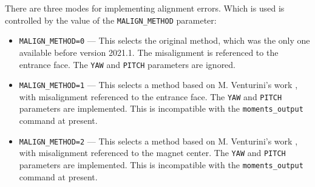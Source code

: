 There are three modes for implementing alignment errors. Which is used
is controlled by the value of the \verb|MALIGN_METHOD| parameter:
\begin{itemize}
\item \verb|MALIGN_METHOD=0| --- This selects the original method, which was
  the only one available before version 2021.1. The misalignment is
  referenced to the entrance face. The \verb|YAW| and \verb|PITCH| parameters
  are ignored.
\item \verb|MALIGN_METHOD=1| --- This selects a method based on M. Venturini's
  work \cite{Venturini2021}, with misalignment referenced to the entrance face.
  The \verb|YAW| and \verb|PITCH| parameters are implemented.
  This is incompatible with the \verb|moments_output| command at present.
\item \verb|MALIGN_METHOD=2| --- This selects a method based on M. Venturini's
  work \cite{Venturini2021}, with misalignment referenced to the magnet center.
  The \verb|YAW| and \verb|PITCH| parameters are implemented.
  This is incompatible with the \verb|moments_output| command at present.
\end{itemize}
